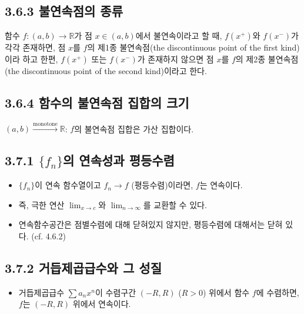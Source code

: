 \documentclass{article}
\begin{document}
\subsection*{\textmd{3.6.3 불연속점의 종류}}

함수 $f: (a, b) \to \mathbb{R}$가 점 $x \in (a, b)$에서 불연속이라고 할 때, $f(x^+)$와 $f(x^-)$가 각각 존재하면,
점 $x$를 $f$의 제1종 불연속점(the discontinuous point of the first kind)이라 하고 한편, 
$f(x^+)$ 또는 $f(x^-)$가 존재하지 않으면 점 $x$를 $f$의 제2종 불연속점(the discontinuous point of the second kind)이라고 한다.

\subsection*{\textmd{3.6.4 함수의 불연속점 집합의 크기}}

$(a, b) \xrightarrow{\text{monotone}} \mathbb{R}$: $f$의 불연속점 집합은 가산 집합이다.

\subsection{\fontsize{11.5}{13}\selectfont{연속함수열의 수렴 정도에 따른 극한함수의 연속성}}

\subsection*{\textmd{3.7.1 \( \{ f_n \} \)의 연속성과 평등수렴}} 
\begin{itemize}
    \item \( \{ f_n \} \)이 연속 함수열이고 \( f_n \to f \) (평등수렴)이라면, \( f \)는 연속이다.
    \item 즉, 극한 연산 \( \lim_{x \to c} \)와 \( \lim_{n \to \infty} \)를 교환할 수 있다.
    \item 연속함수공간은 점별수렴에 대해 닫혀있지 않지만, 평등수렴에 대해서는 닫혀 있다. (cf. 4.6.2)
\end{itemize}

\subsection*{\textmd{3.7.2 거듭제곱급수와 그 성질}} 
\begin{itemize}
    \item 거듭제곱급수 \( \sum a_n x^n \)이 수렴구간 \( (-R, R) \) (\( R > 0 \)) 위에서 함수 \( f \)에 수렴하면, \( f \)는 \( (-R, R) \) 위에서 연속이다.
\end{itemize}
\end{document}
